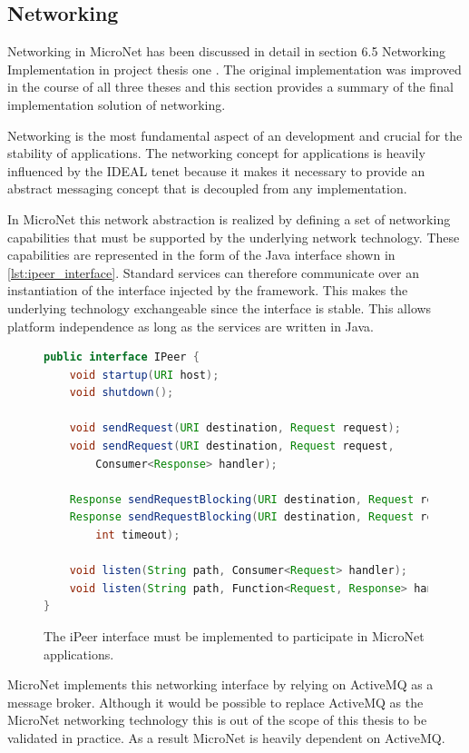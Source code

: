 \subsection{Networking}
\label{sub:networking}
Networking in MicroNet has been discussed in detail in section 6.5 Networking
Implementation in project thesis one \cite{biedermann2015project1}. The original
implementation was improved in the course of all three theses and this section
provides a summary of the final implementation solution of networking.

Networking is the most fundamental aspect of an \og{} development and crucial
for the stability of \ms{} applications. The networking concept for \ms{}
applications is heavily influenced by the IDEAL tenet because it makes it
necessary to provide an abstract messaging concept that is decoupled from any
implementation.

In MicroNet this network abstraction is realized by defining a set of networking
capabilities that must be supported by the underlying network technology. These
capabilities are represented in the form of the  Java interface
shown in \autoref{lst:ipeer_interface}. Standard services can therefore
communicate over an instantiation of the  interface injected by the
framework. This makes the underlying technology exchangeable since the interface
is stable. This allows platform independence as long as the services are written
in Java.

\begin{figure}
	\begin{lstlisting}[language=Java,firstnumber=1] 
public interface IPeer {
	void startup(URI host);
	void shutdown();
	
	void sendRequest(URI destination, Request request);
	void sendRequest(URI destination, Request request, 
		Consumer<Response> handler);
		
	Response sendRequestBlocking(URI destination, Request request);
	Response sendRequestBlocking(URI destination, Request request,
		int timeout);
		
	void listen(String path, Consumer<Request> handler);
	void listen(String path, Function<Request, Response> handler);
}
	\end{lstlisting}
  	\caption{The iPeer interface must be implemented to participate in MicroNet
  	applications.}
  	\label{lst:ipeer_interface}
\end{figure}

MicroNet implements this networking interface by relying on ActiveMQ as a
message broker. Although it would be possible to replace ActiveMQ as the
MicroNet networking technology this is out of the scope of this thesis to be
validated in practice. As a result MicroNet is heavily dependent on ActiveMQ.

